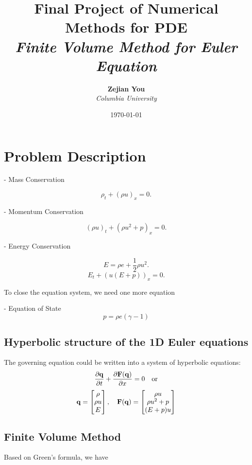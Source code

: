 \documentclass[11pt]{diazessay} %
\title{\textbf{Final Project of Numerical Methods for PDE} \\ {\Large\itshape Finite Volume Method for Euler Equation}} %
\author{\textbf{Zejian You} \\ \textit{Columbia University}} %
\date{\today} %
\begin{document}
\maketitle %


\section{Problem Description}

- Mass Conservation
  
$$\rho_t + (\rho u)_x = 0.$$

- Momentum Conservation

$$(\rho u)_t + (\rho u^2 + p)_x = 0.$$

- Energy Conservation
  
$$E = \rho e + \frac{1}{2}\rho u^2.$$
$$E_t + (u(E+p))_x = 0.$$

To close the equation system, we need one more equation

- Equation of State
$$
p = \rho e(\gamma -1)
$$

\subsection{Hyperbolic structure of the 1D Euler equations}
The governing equation could be written into a system of hyperbolic equations:
$$
    \frac{\partial \bf{q}}{\partial t} + \frac{\partial \bf{F}(\bf{q})}{\partial x} =0 \quad \text{or}
$$
$$
    \bf{q} = \begin{bmatrix}
        \rho \\ \rho u\\ E
    \end{bmatrix}, \quad \bf{F}(\bf{q})=\begin{bmatrix}
        \rho u \\\rho u^2 + p\\(E + p) u
    \end{bmatrix}
$$

\subsection{Finite Volume Method}
Based on Green's formula, we have
\end{document}
